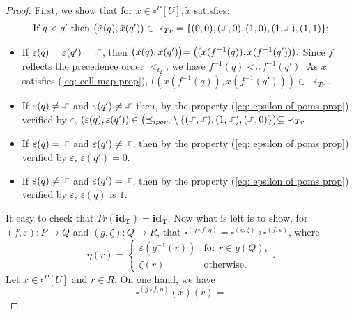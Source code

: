 \documentclass[11pt,a4paper,oldfontcommands]{memoir}
\newcommand*{\intpom}{\TrO}
\newcommand{\TrO}{\mathbf{T}}
\newcommand*\exec{%
  \raisebox{1pt}{%
    \begin{tikzpicture}[x=.8ex,y=1ex,-]
      \draw (0,0) -- (1,0) -- (1,1) -- (2,1);
    \end{tikzpicture}}}
\begin{document}
\begin{proof}
    First, we show that for $x \in \square^P[U], \tilde{x}$ satisfies:
     \begin{equation*}    
       \text{If } q<q' \text{ then } \bigl( \Tilde{x}(q), \Tilde{x}(q')) \in {\prec_{Tr}} = \{(0,0),(\exec, 0),(1,0),(1,\exec),(1,1)\};
    \end{equation*} 
    
     \begin{itemize}
    \item  If $\varepsilon(q)=\varepsilon(q')= \exec$, then $\bigl(\Tilde{x}(q),\Tilde{x}(q') \bigl)=\bigl( (x(f^{-1}(q)),x(f^{-1}(q'))\bigl).$ Since $f$ reflects the precedence order $<_Q$, we have $f^{-1}(q)<_P f^{-1}(q')$.  As $x$ satisfies (\ref{eq: cell map prop}), \linebreak $((x(f^{-1}(q)),x(f^{-1}(q')))\in {\prec_{Tr}}.$
    \item If $\varepsilon(q)\neq \exec$ and $\varepsilon(q') \neq \exec$ then, by the property (\ref{eq: epsilon of poms prop}) verified by $\varepsilon$, \linebreak$(\varepsilon(q),\varepsilon(q'))\in \bigl( {\preceq_{ipom}} \setminus \{ (\exec,\exec), (1,\exec),(\exec,0)\} \bigl) \subseteq {\prec_{Tr}}$. 
    \item If $\varepsilon(q)=\exec$ and $\varepsilon(q') \neq \exec$, then by the property (\ref{eq: epsilon of poms prop}) verified by $\varepsilon$, $\varepsilon(q') = 0$. 
    \item If $\varepsilon(q) \neq \exec$ and $\varepsilon(q') = \exec$, then     by the property (\ref{eq: epsilon of poms prop}) verified by $\varepsilon$, $\varepsilon(q)$ is $1$.
\end{itemize}
It easy to check that $Tr(\mathbf{id}_{\intpom})=\mathbf{id}_{\TrO}$.
Now what is left is to show, for $(f,\varepsilon):P\to Q$ and
    $(g,\zeta):Q\to R$, that $\square^{(g\circ f,\eta)}=\square^{(g,\zeta)} \circ \square^{ (f,\varepsilon)}$, where
    \begin{equation*}
      \eta(r)=
      \begin{cases}
        \varepsilon(g^{-1}(r)) & \text{for $r\in g(Q)$}, \\
        \zeta(r) & \text{otherwise}.
      \end{cases}.
\end{equation*}
Let $x\in \square^{P}[U]$ and $r\in R$. On one hand, we have
\begin{equation*} 
      \square^{(g\circ f,\eta)}(x)(r) =

\end{equation*}
\end{proof}
\end{document}
